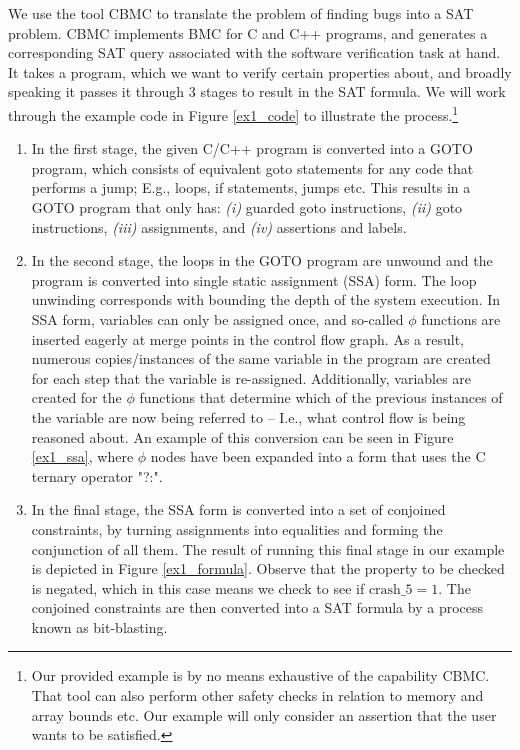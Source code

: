 \documentclass[
10pt, %
a4paper, %
oneside, %
headinclude,footinclude, %
BCOR5mm, %
]{scrartcl}
\begin{document}
We use the tool {\textsc CBMC} to translate the problem of finding bugs into a SAT problem. {\textsc CBMC} implements BMC for C and C++ programs, and generates a corresponding SAT query associated with the software verification task at hand.
It takes a program, which we want to verify certain properties about, and broadly speaking it passes it through 3 stages to result in the SAT formula.
We will work through the example code in Figure \ref{ex1_code} to illustrate the process.\footnote{Our provided example is by no means exhaustive of the capability {\textsc CBMC}. That tool can also perform other safety checks in relation to memory and array bounds etc. Our example will only consider an assertion that the user wants to be satisfied.}
\begin{enumerate}
    \item In the first stage, the given C/C++ program is converted into a GOTO program, which consists of equivalent goto statements for any code that performs a jump; E.g., loops, if statements, jumps etc. This results in a GOTO program that only has: {\em (i)}  guarded goto instructions, {\em (ii)} goto instructions, {\em (iii)} assignments, and {\em (iv)} assertions and labels.
    \item In the second stage, the loops in the GOTO program are unwound and the program is converted into single static assignment (SSA) form. The loop unwinding corresponds with bounding the depth of the system execution. In SSA form, variables can only be assigned once, and so-called $\phi$ functions are inserted eagerly at merge points in the control flow graph. As a result, numerous copies/instances of the same variable in the program are created for each step that the variable is re-assigned. Additionally, variables are created for the $\phi$ functions that determine which of the previous instances of the variable are now being referred to -- I.e., what control flow is being reasoned about. An example of this conversion can be seen in Figure \ref{ex1_ssa}, where $\phi$ nodes have been expanded into a form that uses the C ternary operator "?:".
    \item In the final stage, the SSA form is converted into a set of conjoined constraints, by turning assignments into equalities and forming the conjunction of all them. The result of running this final stage in our example is depicted in Figure \ref{ex1_formula}. Observe that the property to be checked is negated, which in this case means we check to see if $\mbox{crash}\_5 = 1$. The conjoined constraints are then converted into a SAT formula by a process known as bit-blasting.
\end{enumerate}
\end{document}
